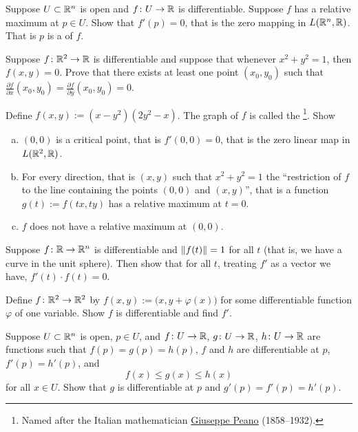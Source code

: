 \begin{exercise} \label{exercise:mv:maximumcritical}
Suppose $U \subset {\mathbb{R}}^n$ is open and
$f \colon U \to {\mathbb{R}}$ is differentiable.  Suppose $f$ has a relative maximum
at $p \in U$.  Show that $f'(p) = 0$, that is the zero mapping in
$L({\mathbb{R}}^n,{\mathbb{R}})$.  That is $p$ is a
\emph{} of $f$.
\end{exercise}

\begin{exercise}
Suppose $f \colon {\mathbb{R}}^2 \to {\mathbb{R}}$ is differentiable and suppose that
whenever $x^2+y^2 = 1$, then $f(x,y) = 0$.  Prove that there exists at least
one point $(x_0,y_0)$ such that
$\frac{\partial f}{\partial x}(x_0,y_0) = \frac{\partial f}{\partial
y}(x_0,y_0) = 0$.
\end{exercise}

\begin{exercise} \label{exercise:peano}
Define $f(x,y) := ( x-y^2 ) ( 2 y^2 - x)$.  The graph of $f$ is called
the \emph{}%
\footnote{Named after the Italian mathematician
\href{http://en.wikipedia.org/wiki/Giuseppe_Peano}{Giuseppe Peano}
(1858--1932).}.
Show
\begin{enumerate}[a)]
\item
$(0,0)$ is a critical point, that is $f'(0,0) = 0$, that is the zero
linear map in $L({\mathbb{R}}^2,{\mathbb{R}})$.
\item
For every direction, that is $(x,y)$ such that $x^2+y^2=1$ the
``restriction of $f$ to the line containing the points $(0,0)$ and
$(x,y)$'', that is a function $g(t) := f(tx,ty)$ has a relative maximum at
$t=0$.
\item
$f$ does not have a relative maximum at $(0,0)$.
\end{enumerate}
\end{exercise}

\begin{exercise}
Suppose $f \colon {\mathbb{R}} \to {\mathbb{R}}^n$ is differentiable and $\lVert {f(t)} \rVert = 1$ for
all $t$ (that is, we have a curve in the unit sphere).  Then show that for
all $t$, treating $f'$ as a vector we have, $f'(t) \cdot f(t) = 0$.
\end{exercise}

\begin{exercise}
Define $f \colon {\mathbb{R}}^2 \to {\mathbb{R}}^2$ by $f(x,y) :=
\bigl(x,y+\varphi(x)\bigr)$ for some differentiable function $\varphi$ of one
variable.  Show $f$ is differentiable and find $f'$.
\end{exercise}

\begin{exercise}
Suppose $U \subset {\mathbb{R}}^n$ is open, $p \in U$, and
$f \colon U \to {\mathbb{R}}$,
$g \colon U \to {\mathbb{R}}$,
$h \colon U \to {\mathbb{R}}$ are functions such that
$f(p) = g(p) = h(p)$, $f$ and $h$ are differentiable at $p$,
$f'(p) = h'(p)$, and
\begin{equation*}
f(x) \leq g(x) \leq h(x)
\end{equation*}
for all $x \in U$.  Show that $g$ is differentiable at $p$ and 
$g'(p) = f'(p) = h'(p)$.
\end{exercise}

